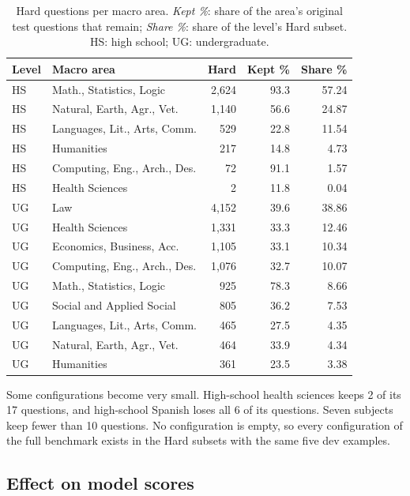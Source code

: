 \begin{table}[t]
\centering
\footnotesize
\setlength{\tabcolsep}{3pt}
\begin{tabular}{@{}llrrr@{}}
\toprule
Level & Macro area & Hard & Kept \% & Share \% \\
\midrule
HS & Math., Statistics, Logic & 2,624 & 93.3 & 57.24 \\
HS & Natural, Earth, Agr., Vet. & 1,140 & 56.6 & 24.87 \\
HS & Languages, Lit., Arts, Comm. & 529 & 22.8 & 11.54 \\
HS & Humanities & 217 & 14.8 & 4.73 \\
HS & Computing, Eng., Arch., Des. & 72 & 91.1 & 1.57 \\
HS & Health Sciences & 2 & 11.8 & 0.04 \\
\midrule
UG & Law & 4,152 & 39.6 & 38.86 \\
UG & Health Sciences & 1,331 & 33.3 & 12.46 \\
UG & Economics, Business, Acc. & 1,105 & 33.1 & 10.34 \\
UG & Computing, Eng., Arch., Des. & 1,076 & 32.7 & 10.07 \\
UG & Math., Statistics, Logic & 925 & 78.3 & 8.66 \\
UG & Social and Applied Social & 805 & 36.2 & 7.53 \\
UG & Languages, Lit., Arts, Comm. & 465 & 27.5 & 4.35 \\
UG & Natural, Earth, Agr., Vet. & 464 & 33.9 & 4.34 \\
UG & Humanities & 361 & 23.5 & 3.38 \\
\bottomrule
\end{tabular}
\caption{Hard questions per macro area. \emph{Kept \%}: share of the area's
original test questions that remain; \emph{Share \%}: share of the level's
Hard subset. HS: high school; UG: undergraduate.}
\label{tab:hard-composition}
\end{table}

Some configurations become very small. High-school health sciences keeps 2
of its 17 questions, and high-school Spanish loses all 6 of its questions.
Seven subjects keep fewer than 10 questions. No configuration is empty, so
every configuration of the full benchmark exists in the Hard subsets with the
same five dev examples.

\subsection{Effect on model scores}
\label{app:hard-scores}

